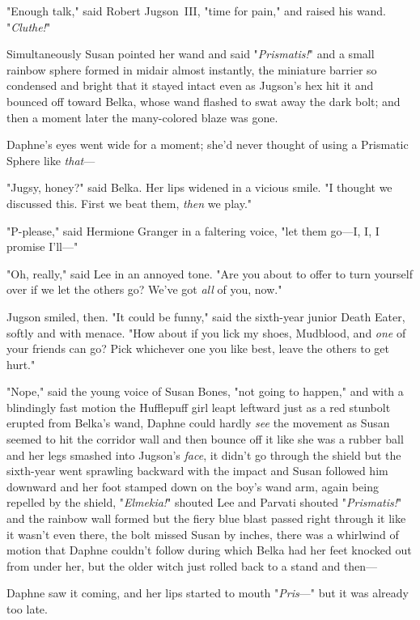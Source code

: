 "Enough talk," said Robert Jugson~III, "time for pain," and raised his wand.
"\emph{Cluthe!}"

Simultaneously Susan pointed her wand and said "\emph{Prismatis!}" and a small
rainbow sphere formed in midair almost instantly, the miniature barrier so
condensed and bright that it stayed intact even as Jugson's hex hit it and
bounced off toward Belka, whose wand flashed to swat away the dark bolt; and
then a moment later the many-colored blaze was gone.

Daphne's eyes went wide for a moment; she'd never thought of using a Prismatic
Sphere like \emph{that}\mbox{---}

"Jugsy, honey?" said Belka. Her lips widened in a vicious smile. "I thought we
discussed this. First we beat them, \emph{then} we play."

"P-please," said Hermione Granger in a faltering voice, "let them go---I, I, I
promise I'll\mbox{---}"

"Oh, really," said Lee in an annoyed tone. "Are you about to offer to turn
yourself over if we let the others go? We've got \emph{all} of you, now."

Jugson smiled, then. "It could be funny," said the sixth-year junior Death
Eater, softly and with menace. "How about if you lick my shoes, Mudblood, and
\emph{one} of your friends can go? Pick whichever one you like best, leave the
others to get hurt."

"Nope," said the young voice of Susan Bones, "not going to happen," and with a
blindingly fast motion the Hufflepuff girl leapt leftward just as a red
stunbolt erupted from Belka's wand, Daphne could hardly \emph{see} the movement
as Susan seemed to hit the corridor wall and then bounce off it like she was a
rubber ball and her legs smashed into Jugson's \emph{face}, it didn't go
through the shield but the sixth-year went sprawling backward with the impact
and Susan followed him downward and her foot stamped down on the boy's wand
arm, again being repelled by the shield, "\emph{Elmekia!}" shouted Lee and
Parvati shouted "\emph{Prismatis!}" and the rainbow wall formed but the fiery
blue blast passed right through it like it wasn't even there, the bolt missed
Susan by inches, there was a whirlwind of motion that Daphne couldn't follow
during which Belka had her feet knocked out from under her, but the older witch
just rolled back to a stand and then\mbox{---}

Daphne saw it coming, and her lips started to mouth "\emph{Pris}\mbox{---}" but it was
already too late.

